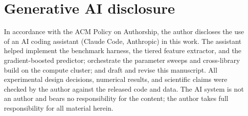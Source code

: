 \documentclass[11pt]{article}
\begin{document}
\section*{Generative AI disclosure}
In accordance with the ACM Policy on Authorship, the author discloses the use
of an AI coding assistant (Claude Code, Anthropic) in this work. The assistant
helped implement the benchmark harness, the tiered feature extractor, and the
gradient-boosted predictor; orchestrate the parameter sweeps and cross-library
build on the compute cluster; and draft and revise this manuscript. All
experimental design decisions, numerical results, and scientific claims were
checked by the author against the released code and data. The AI system is not
an author and bears no responsibility for the content; the author takes full
responsibility for all material herein.
\end{document}
